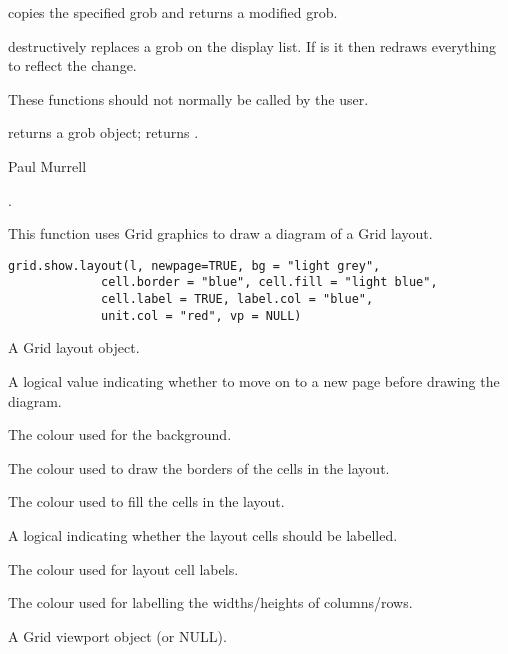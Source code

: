 %
\begin{Details}\relax
{} copies the specified grob and returns a modified
grob.

 destructively replaces a grob on the display list.
If 
is  it then redraws everything to reflect the change.

These functions should not normally be called by the user.
\end{Details}
%
\begin{Value}
 returns a grob object;   returns .
\end{Value}
%
\begin{Author}\relax
Paul Murrell
\end{Author}
%
\begin{SeeAlso}\relax
{}.
\end{SeeAlso}
%
\begin{Description}\relax
This function uses Grid graphics to draw a diagram of a
Grid layout.
\end{Description}
%
\begin{Usage}
\begin{verbatim}
grid.show.layout(l, newpage=TRUE, bg = "light grey",
             cell.border = "blue", cell.fill = "light blue",
             cell.label = TRUE, label.col = "blue",
             unit.col = "red", vp = NULL) 
\end{verbatim}
\end{Usage}
%
\begin{Arguments}
\begin{ldescription}
\item[\code{l}] A Grid layout object.
\item[\code{newpage}] A logical value indicating whether to move on
to a new page before drawing the diagram.
\item[\code{bg}] The colour used for the background.
\item[\code{cell.border}] The colour used to draw the borders of the cells
in the layout.
\item[\code{cell.fill}] The colour used to fill the cells in the layout.
\item[\code{cell.label}] A logical indicating whether the layout cells
should be labelled.
\item[\code{label.col}] The colour used for layout cell labels.
\item[\code{unit.col}] The colour used for labelling the widths/heights of
columns/rows.
\item[\code{vp}] A Grid viewport object (or NULL).
\end{ldescription}
\end{Arguments}
